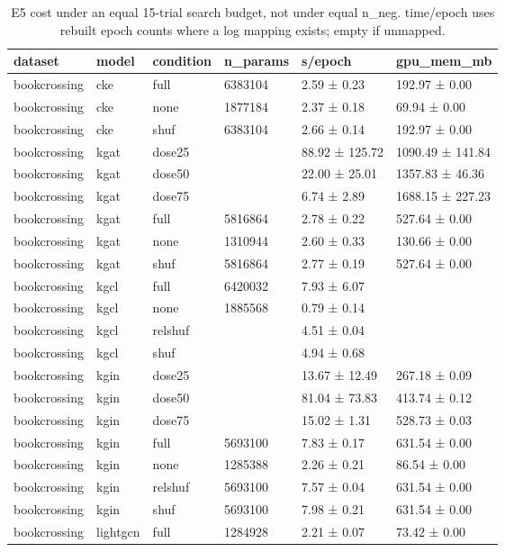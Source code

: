 \begin{table}[t]
\centering
\caption{E5 cost under an equal 15-trial search budget, not under equal n\_neg. time/epoch uses rebuilt epoch counts where a log mapping exists; empty if unmapped.}
\label{tab:e5}
\begin{tabular}{llllll}
\hline
dataset & model & condition & n\_params & s/epoch & gpu\_mem\_mb \\
\hline
bookcrossing & cke & full & 6383104 & 2.59 ± 0.23 & 192.97 ± 0.00 \\
bookcrossing & cke & none & 1877184 & 2.37 ± 0.18 & 69.94 ± 0.00 \\
bookcrossing & cke & shuf & 6383104 & 2.66 ± 0.14 & 192.97 ± 0.00 \\
bookcrossing & kgat & dose25 &  & 88.92 ± 125.72 & 1090.49 ± 141.84 \\
bookcrossing & kgat & dose50 &  & 22.00 ± 25.01 & 1357.83 ± 46.36 \\
bookcrossing & kgat & dose75 &  & 6.74 ± 2.89 & 1688.15 ± 227.23 \\
bookcrossing & kgat & full & 5816864 & 2.78 ± 0.22 & 527.64 ± 0.00 \\
bookcrossing & kgat & none & 1310944 & 2.60 ± 0.33 & 130.66 ± 0.00 \\
bookcrossing & kgat & shuf & 5816864 & 2.77 ± 0.19 & 527.64 ± 0.00 \\
bookcrossing & kgcl & full & 6420032 & 7.93 ± 6.07 &  \\
bookcrossing & kgcl & none & 1885568 & 0.79 ± 0.14 &  \\
bookcrossing & kgcl & relshuf &  & 4.51 ± 0.04 &  \\
bookcrossing & kgcl & shuf &  & 4.94 ± 0.68 &  \\
bookcrossing & kgin & dose25 &  & 13.67 ± 12.49 & 267.18 ± 0.09 \\
bookcrossing & kgin & dose50 &  & 81.04 ± 73.83 & 413.74 ± 0.12 \\
bookcrossing & kgin & dose75 &  & 15.02 ± 1.31 & 528.73 ± 0.03 \\
bookcrossing & kgin & full & 5693100 & 7.83 ± 0.17 & 631.54 ± 0.00 \\
bookcrossing & kgin & none & 1285388 & 2.26 ± 0.21 & 86.54 ± 0.00 \\
bookcrossing & kgin & relshuf & 5693100 & 7.57 ± 0.04 & 631.54 ± 0.00 \\
bookcrossing & kgin & shuf & 5693100 & 7.98 ± 0.21 & 631.54 ± 0.00 \\
bookcrossing & lightgcn & full & 1284928 & 2.21 ± 0.07 & 73.42 ± 0.00 \\

\end{tabular}
\end{table}
